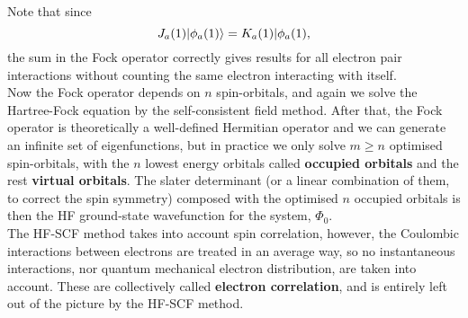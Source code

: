 Note that since 
\begin{equation}
J_a(1)|\phi_a(1)\rangle=K_a(1)|\phi_a(1), 
\end{equation}
the sum in the Fock operator correctly gives results for all electron pair interactions without counting the same electron interacting with itself. \\
Now the Fock operator depends on $n$ spin-orbitals, and again we solve the 
Hartree-Fock equation by the self-consistent field method. After that, the 
Fock operator is theoretically a well-defined Hermitian operator and we can 
generate an infinite set of eigenfunctions, but in practice we only solve 
$m\geq n$ optimised spin-orbitals, with the $n$ lowest energy orbitals called 
\textbf{occupied orbitals} and the rest \textbf{virtual orbitals}. The slater 
determinant (or a linear combination of them, to correct the spin symmetry) 
composed with the optimised $n$ occupied orbitals is then the 
HF ground-state wavefunction for the system, $\Phi_0$. \\
The HF-SCF method takes into account spin correlation, however, the Coulombic 
interactions between electrons are treated in an average way, so no instantaneous 
interactions, nor quantum mechanical electron distribution, are taken into 
account. These are collectively called \textbf{electron correlation}, and is 
entirely left out of the picture by the HF-SCF method. 